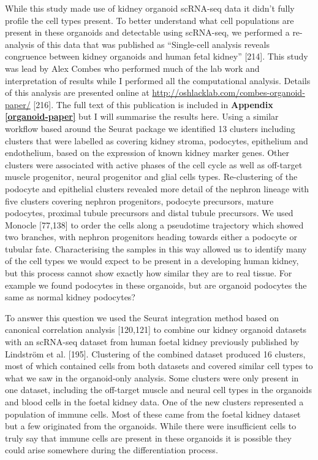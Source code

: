 \documentclass[11pt,a4paper,titlepage,twoside,openright]{style/unimelbthesis}
\theoremstyle{definition}
\theoremstyle{definition}
\theoremstyle{definition}
\theoremstyle{remark}
\begin{document}
\begin{mainmatter}
While this study made use of kidney organoid scRNA-seq data it didn't fully profile the cell types present. To better understand what cell populations are present in these organoids and detectable using scRNA-seq, we performed a re-analysis of this data that was published as \enquote{Single-cell analysis reveals congruence between kidney organoids and human fetal kidney} {[}214{]}. This study was lead by Alex Combes who performed much of the lab work and interpretation of results while I performed all the computational analysis. Details of this analysis are presented online at \url{http://oshlacklab.com/combes-organoid-paper/} {[}216{]}. The full text of this publication is included in \textbf{Appendix \ref{organoid-paper}} but I will summarise the results here. Using a similar workflow based around the Seurat package we identified 13 clusters including clusters that were labelled as covering kidney stroma, podocytes, epithelium and endothelium, based on the expression of known kidney marker genes. Other clusters were associated with active phases of the cell cycle as well as off-target muscle progenitor, neural progenitor and glial cells types. Re-clustering of the podocyte and epithelial clusters revealed more detail of the nephron lineage with five clusters covering nephron progenitors, podocyte precursors, mature podocytes, proximal tubule precursors and distal tubule precursors. We used Monocle {[}77,138{]} to order the cells along a pseudotime trajectory which showed two branches, with nephron progenitors heading towards either a podocyte or tubular fate. Characterising the samples in this way allowed us to identify many of the cell types we would expect to be present in a developing human kidney, but this process cannot show exactly how similar they are to real tissue. For example we found podocytes in these organoids, but are organoid podocytes the same as normal kidney podocytes?

To answer this question we used the Seurat integration method based on canonical correlation analysis {[}120,121{]} to combine our kidney organoid datasets with an scRNA-seq dataset from human foetal kidney previously published by Lindström et al. {[}195{]}. Clustering of the combined dataset produced 16 clusters, most of which contained cells from both datasets and covered similar cell types to what we saw in the organoid-only analysis. Some clusters were only present in one dataset, including the off-target muscle and neural cell types in the organoids and blood cells in the foetal kidney data. One of the new clusters represented a population of immune cells. Most of these came from the foetal kidney dataset but a few originated from the organoids. While there were insufficient cells to truly say that immune cells are present in these organoids it is possible they could arise somewhere during the differentiation process.


\end{mainmatter}
\end{document}
